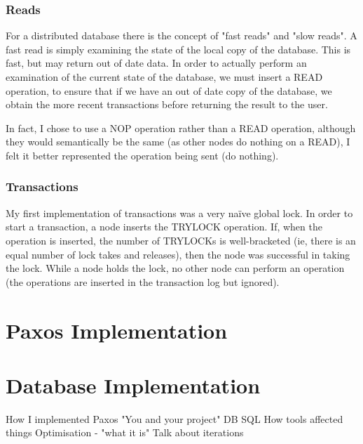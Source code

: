 \documentclass[12pt,twoside,notitlepage]{report}
\begin{document}
\subsubsection{Reads}

For a distributed database there is the concept of "fast reads" and "slow reads". A fast read is
simply examining the state of the local copy of the database. This is fast, but may return out of
date data. In order to actually perform an examination of the current state of the database, we
must insert a READ operation, to ensure that if we have an out of date copy of the database, we
obtain the more recent transactions before returning the result to the user.

In fact, I chose to use a NOP operation rather than a READ operation, although they would
semantically be the same (as other nodes do nothing on a READ), I felt it better represented the
operation being sent (do nothing).


\subsubsection{Transactions}

My first implementation of transactions was a very na\"ive global lock. In order to start a
transaction, a node inserts the TRYLOCK operation. If, when the operation is inserted, the number
of TRYLOCKs is well-bracketed (ie, there is an equal number of lock takes and releases), then the
node was successful in taking the lock. While a node holds the lock, no other node can perform an
operation (the operations are inserted in the transaction log but ignored).

\section{Paxos Implementation}

\section{Database Implementation}

How I implemented Paxos
"You and your project"
DB
SQL
How tools affected things
Optimisation - "what it is"
Talk about iterations
\end{document}
